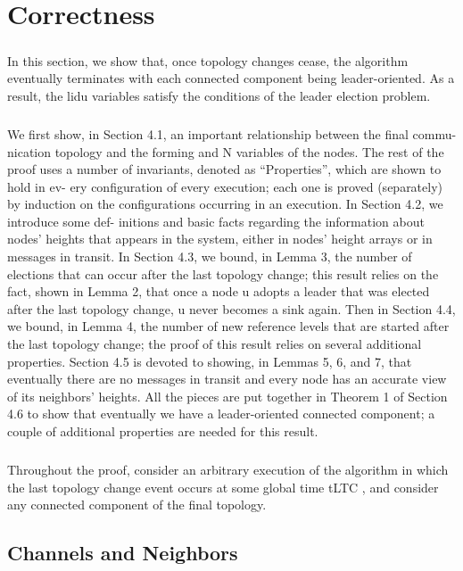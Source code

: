 \chapter{Correctness}
\paragraph{}In this section, we show that, once topology changes cease, the algorithm eventually terminates with each connected component being leader-oriented. As a result, the lidu variables satisfy the conditions of the leader election problem.
\paragraph{}We first show, in Section 4.1, an important relationship between the final commu- nication topology and the forming and N variables of the nodes. The rest of the proof uses a number of invariants, denoted as “Properties”, which are shown to hold in ev- ery configuration of every execution; each one is proved (separately) by induction on the configurations occurring in an execution. In Section 4.2, we introduce some def- initions and basic facts regarding the information about nodes' heights that appears in the system, either in nodes' height arrays or in messages in transit. In Section 4.3, we bound, in Lemma 3, the number of elections that can occur after the last topology change; this result relies on the fact, shown in Lemma 2, that once a node u adopts a leader that was elected after the last topology change, u never becomes a sink again. Then in Section 4.4, we bound, in Lemma 4, the number of new reference levels that are started after the last topology change; the proof of this result relies on several additional properties. Section 4.5 is devoted to showing, in Lemmas 5, 6, and 7, that eventually there are no messages in transit and every node has an accurate view of its neighbors' heights. All the pieces are put together in Theorem 1 of Section 4.6 to show that eventually we have a leader-oriented connected component; a couple of additional properties are needed for this result.
\paragraph{}Throughout the proof, consider an arbitrary execution of the algorithm in which the last topology change event occurs at some global time tLTC , and consider any connected component of the final topology.
\section{Channels and Neighbors}
